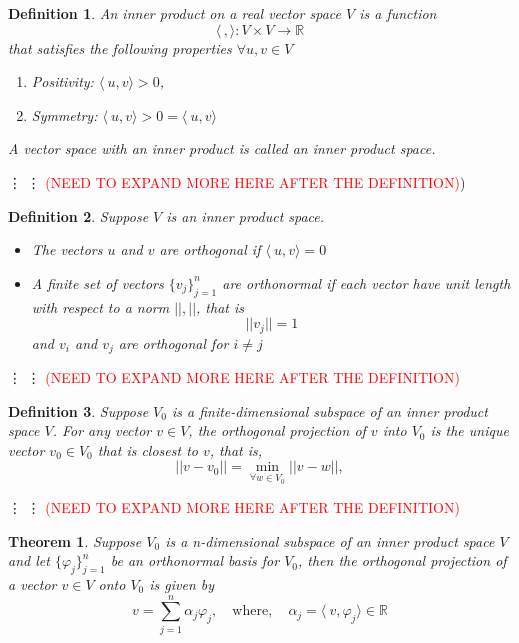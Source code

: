 \documentclass[11pt, oneside]{article}   	%
\newtheorem{theorem}{Theorem}
\newtheorem{definition}{Definition}
\begin{document}
\begin{definition}
An inner product on a real vector space $V$ is a function 
\begin{equation}
\langle\,,\rangle : V\times V \rightarrow \mathbb{R} \nonumber
\end{equation}
that satisfies the following properties $\forall u,v \in V$
\begin{enumerate}
\item Positivity: $\langle\ u,v \rangle > 0$, \quad 
\item Symmetry: $\langle\ u,v \rangle > 0  = \langle\ u,v \rangle$
\end{enumerate}
A vector space with an inner product is called an inner product space.
\end{definition}
\vdots
\vdots
\textcolor{red}{(NEED TO EXPAND MORE HERE AFTER THE DEFINITION)})
\begin{definition}
Suppose $V$ is an inner product space.
\begin{itemize}
\item The vectors $u$ and $v$ are orthogonal if $\langle\ u,v \rangle = 0$
\item A finite set of vectors $\{ v_{j} \}_{j=1}^{n}$ are orthonormal if each vector have unit length with respect to a norm $||, ||$, that is 
\begin{equation}
||v_{j}|| = 1 \nonumber
\end{equation}
and $v_{i}$ and $v_{j}$ are orthogonal for $i\neq j$ 
\end{itemize}
\end{definition}
\vdots
\vdots
\textcolor{red}{(NEED TO EXPAND MORE HERE AFTER THE DEFINITION)}

\begin{definition}
Suppose $V_{0}$ is a finite-dimensional subspace of an inner product space $V$. For any vector $v \in V$, the orthogonal projection of $v$
into $V_{0}$ is the unique vector $v_{0} \in V_{0}$ that is closest to $v$, that is,
\begin{equation}
 ||v-v_{0}|| =  \min_{\forall w \in V_{0}} || v-w ||,
\end{equation}
\end{definition}
\vdots
\vdots
\textcolor{red}{(NEED TO EXPAND MORE HERE AFTER THE DEFINITION)}
\begin{theorem}\label{orthogonalityTheorem}
Suppose $V_{0}$ is a  n-dimensional subspace of an inner product space $V$ and let $\{  \varphi_{j} \}_{j=1}^{n}$ be an orthonormal basis for $V_{0}$, then the orthogonal projection
of a vector $v\in V$ onto $V_{0}$ is given by 
\begin{equation}
v = \sum_{j=1}^{n}\alpha_{j}\varphi_{j}, \quad \text{where}, \quad \alpha_{j} = \langle\ v,\varphi_{j} \rangle \in \mathbb{R}
\end{equation}
\end{theorem}
\end{document}
